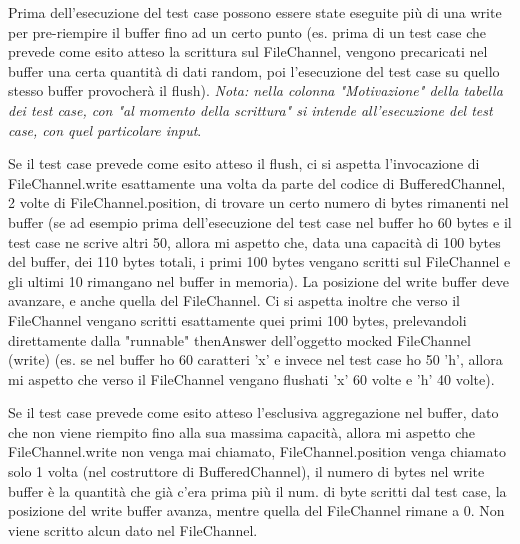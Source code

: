 \documentclass[10pt, a4paper]{article}
\begin{document}
	Prima dell'esecuzione del test case possono essere state eseguite più
	di una write per pre-riempire il buffer fino ad un certo punto (es. prima di un test
	case che prevede come esito atteso la scrittura sul FileChannel, vengono precaricati
	nel buffer una certa quantità di dati random, poi l'esecuzione del test case su quello
	stesso buffer provocherà il flush).
	\textit{Nota: nella colonna "Motivazione" della tabella dei test case, con "al momento della scrittura"
	si intende all'esecuzione del test case, con quel particolare input}.
	
	Se il test case prevede come esito atteso il 
	flush, ci si aspetta l'invocazione di FileChannel.write esattamente una volta
	da parte del codice di BufferedChannel, 2 volte di FileChannel.position, di trovare un certo numero di
	bytes rimanenti nel buffer (se ad esempio prima dell'esecuzione del test case nel buffer ho 60 bytes e
	il test case ne scrive altri 50, allora mi aspetto che, data una capacità di 100 bytes del buffer,
	dei 110 bytes totali, i primi 100 bytes vengano scritti sul FileChannel e gli ultimi 10 rimangano nel
	buffer in memoria). La posizione del write buffer deve avanzare, e anche quella del FileChannel.
	Ci si aspetta inoltre che verso il FileChannel vengano scritti esattamente quei primi 100 bytes,
	prelevandoli direttamente dalla "runnable" thenAnswer dell'oggetto mocked FileChannel (write)
	(es. se nel buffer ho 60 caratteri 'x' e invece nel test case ho 50 'h', allora mi aspetto che verso il
	FileChannel vengano flushati 'x' 60 volte e 'h' 40 volte).
	
	Se il test case prevede come esito atteso l'esclusiva aggregazione nel buffer, dato che non 
	viene riempito fino alla sua massima capacità, allora mi aspetto che FileChannel.write non venga mai chiamato,
	FileChannel.position venga chiamato solo 1 volta (nel costruttore di BufferedChannel), il numero di bytes
	nel write buffer è la quantità che già c'era prima più il num. di byte scritti dal test case, la posizione
	del write buffer avanza, mentre quella del FileChannel rimane a 0. Non viene scritto alcun dato nel
	FileChannel.
	
\end{document}
